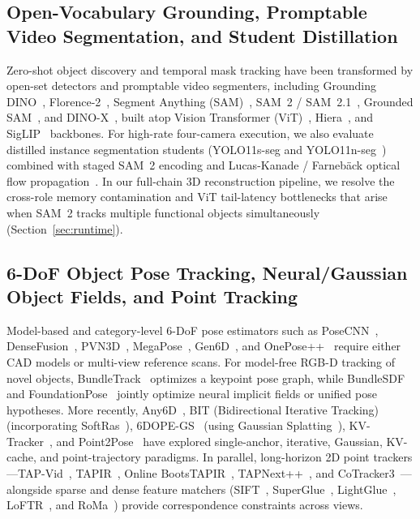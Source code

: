 \documentclass[10pt,journal]{IEEEtran}
\begin{document}
\subsection{Open-Vocabulary Grounding, Promptable Video Segmentation, and Student Distillation}
Zero-shot object discovery and temporal mask tracking have been transformed by open-set detectors and promptable video segmenters, including Grounding DINO~\cite{liu2023grounding}, Florence-2~\cite{xiao2024florence2}, Segment Anything (SAM)~\cite{kirillov2023segment}, SAM~2 / SAM~2.1~\cite{ravi2024sam2}, Grounded SAM~\cite{ren2024groundedsam}, and DINO-X~\cite{ren2024dinox}, built atop Vision Transformer (ViT)~\cite{dosovitskiy2021vit}, Hiera~\cite{ryali2023hiera}, and SigLIP~\cite{zhai2023siglip} backbones. For high-rate four-camera execution, we also evaluate distilled instance segmentation students (YOLO11s-seg and YOLO11n-seg~\cite{jocher2024yolo11}) combined with staged SAM~2 encoding and Lucas-Kanade / Farneb\"ack optical flow propagation~\cite{lucas1981iterative,farneback2003two}. In our full-chain 3D reconstruction pipeline, we resolve the cross-role memory contamination and ViT tail-latency bottlenecks that arise when SAM~2 tracks multiple functional objects simultaneously (Section~\ref{sec:runtime}).

\subsection{6-DoF Object Pose Tracking, Neural/Gaussian Object Fields, and Point Tracking}
Model-based and category-level 6-DoF pose estimators such as PoseCNN~\cite{xiang2018posecnn}, DenseFusion~\cite{wang2019densefusion}, PVN3D~\cite{he2020pvn3d}, MegaPose~\cite{labbe2022megapose}, Gen6D~\cite{liu2022gen6d}, and OnePose++~\cite{he2022oneposepp} require either CAD models or multi-view reference scans. For model-free RGB-D tracking of novel objects, BundleTrack~\cite{wen2021bundletrack} optimizes a keypoint pose graph, while BundleSDF~\cite{wen2023bundlesdf} and FoundationPose~\cite{wen2024foundationpose} jointly optimize neural implicit fields or unified pose hypotheses. More recently, Any6D~\cite{lee2025any6d}, BIT (Bidirectional Iterative Tracking)~\cite{song2025bit} (incorporating SoftRas~\cite{liu2019softras}), 6DOPE-GS~\cite{jin20256dopegs} (using Gaussian Splatting~\cite{kerbl20233dgs}), KV-Tracker~\cite{elich2026kvtracker}, and Point2Pose~\cite{point2pose2026} have explored single-anchor, iterative, Gaussian, KV-cache, and point-trajectory paradigms. In parallel, long-horizon 2D point trackers---TAP-Vid~\cite{doersch2022tapvid}, TAPIR~\cite{doersch2023tapir}, Online BootsTAPIR~\cite{doersch2024bootstap}, TAPNext++~\cite{zholus2025tapnext}, and CoTracker3~\cite{karaev2024cotracker3}---alongside sparse and dense feature matchers (SIFT~\cite{lowe2004sift}, SuperGlue~\cite{sarlin2020superglue}, LightGlue~\cite{lindenberger2023lightglue}, LoFTR~\cite{sun2021loftr}, and RoMa~\cite{edstedt2024roma}) provide correspondence constraints across views.
\end{document}
